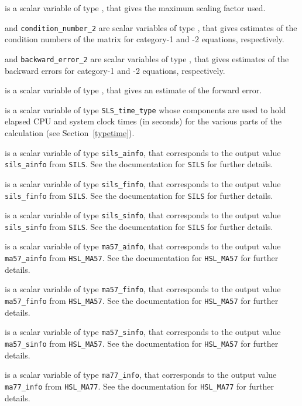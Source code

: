 \documentclass{galahad}
\newcommand{\packagename}{SLS}
\begin{document}
\begin{description}
 is a scalar variable of type \realdp,
that gives the maximum scaling factor used.

 and
{\tt condition\_number\_2} are scalar variables of type \realdp,
that gives estimates of the condition numbers of the matrix
for category-1 and -2 equations, respectively.

 and
{\tt backward\_error\_2} are scalar variables of type \realdp,
that gives estimates of the backward errors
for category-1 and -2 equations, respectively.

 is a scalar variable of type \realdp,
that gives an estimate of the forward error.

 is a scalar variable of type {\tt \packagename\_time\_type}
whose components are used to hold elapsed CPU and system clock times
(in seconds) for the various parts of the calculation
(see Section~\ref{typetime}).

 is a scalar variable of type {\tt sils\_ainfo},
that corresponds to the output value {\tt sils\_ainfo}
from {\tt SILS}. See the documentation for {\tt SILS} for further
details.

 is a scalar variable of type {\tt sils\_finfo},
that corresponds to the output value {\tt sils\_finfo}
from {\tt SILS}. See the documentation for {\tt SILS} for further
details.

 is a scalar variable of type {\tt sils\_sinfo},
that corresponds to the output value {\tt sils\_sinfo}
from {\tt SILS}. See the documentation for {\tt SILS} for further
details.

 is a scalar variable of type {\tt ma57\_ainfo},
that corresponds to the output value {\tt ma57\_ainfo}
from {\tt HSL\_MA57}. See the documentation for {\tt HSL\_MA57} for further
details.

 is a scalar variable of type {\tt ma57\_finfo},
that corresponds to the output value {\tt ma57\_finfo}
from {\tt HSL\_MA57}. See the documentation for {\tt HSL\_MA57} for further
details.

 is a scalar variable of type {\tt ma57\_sinfo},
that corresponds to the output value {\tt ma57\_sinfo}
from {\tt HSL\_MA57}. See the documentation for {\tt HSL\_MA57} for further
details.

 is a scalar variable of type {\tt ma77\_info},
that corresponds to the output value {\tt ma77\_info}
from {\tt HSL\_MA77}. See the documentation for {\tt HSL\_MA77} for further
details.


\end{description}
\end{document}
